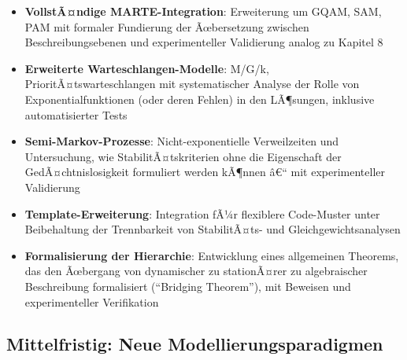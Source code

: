﻿\documentclass[a4paper,12pt]{report}
\theoremstyle{definition}
\begin{document}
\begin{itemize}
	\item[-] \textbf{VollstÃ¤ndige MARTE-Integration}: Erweiterung um GQAM, SAM, PAM mit formaler Fundierung der Ãœbersetzung zwischen Beschreibungsebenen und experimenteller Validierung analog zu Kapitel 8
	
	\item[-] \textbf{Erweiterte Warteschlangen-Modelle}: M/G/k, PrioritÃ¤tswarteschlangen mit systematischer Analyse der Rolle von Exponentialfunktionen (oder deren Fehlen) in den LÃ¶sungen, inklusive automatisierter Tests
	
	\item[-] \textbf{Semi-Markov-Prozesse}: Nicht-exponentielle Verweilzeiten und Untersuchung, wie StabilitÃ¤tskriterien ohne die Eigenschaft der GedÃ¤chtnislosigkeit formuliert werden kÃ¶nnen â€“ mit experimenteller Validierung
	
	\item[-] \textbf{Template-Erweiterung}: Integration fÃ¼r flexiblere Code-Muster unter Beibehaltung der Trennbarkeit von StabilitÃ¤ts- und Gleichgewichtsanalysen
	
	\item[-] \textbf{Formalisierung der Hierarchie}: Entwicklung eines allgemeinen Theorems, das den Ãœbergang von dynamischer zu stationÃ¤rer zu algebraischer Beschreibung formalisiert (``Bridging Theorem''), mit Beweisen und experimenteller Verifikation
\end{itemize}

\subsection{Mittelfristig: Neue Modellierungsparadigmen}
\end{document}
